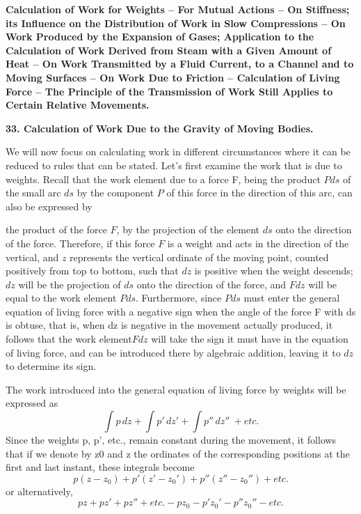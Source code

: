 \documentclass{book}
\begin{document}

\textbf{Calculation of Work for Weights – For Mutual Actions – On Stiffness; its Influence on the Distribution of Work in Slow Compressions – On Work Produced by the Expansion of Gases; Application to the Calculation of Work Derived from Steam with a Given Amount of Heat – On Work Transmitted by a Fluid Current, to a Channel and to Moving Surfaces – On Work Due to Friction – Calculation of Living Force – The Principle of the Transmission of Work Still Applies to Certain Relative Movements.}
\vspace{4mm}

\vspace{4mm}
\textbf{33. Calculation of Work Due to the Gravity of Moving Bodies.}
\vspace{4mm} 


We will now focus on calculating work in different circumstances where it can be reduced to rules that can be stated.
Let's first examine the work that is due to weights.
Recall that the work element due to a force F, being the product \(Pds\) of the small arc \(ds\) by the component \(P\) of this force in the direction of this arc, can also be expressed by 

the product of the force \(F\), by the projection of the element \(ds\) onto the direction of the force. Therefore, if this force \(F\) is a weight and acts in the direction of the vertical, and \(z\) represents the vertical ordinate of the moving point, counted positively from top to bottom, such that \(dz\) is positive when the weight descends; \(dz\) will be the projection of \(ds\) onto the direction of the force, and \(Fdz\) will be equal to the work element 
 \(Pds\). Furthermore, since \(Pds\) must enter the general equation of living force with a negative sign when the angle of the force F with ds is obtuse, that is, when dz is negative in the movement actually produced, it follows that the work element\(Fdz\) will take the sign it must have in the equation of living force, and can be introduced there by algebraic addition, leaving it to \(dz\) to determine its sign.

 The work introduced into the general equation of living force by weights will be expressed as
\[\int p\,dz + \int p'\,dz' + \int p''\,dz''\ + etc. \]
Since the weights p, p', etc., remain constant during the movement, it follows that if we denote by z0 and z the ordinates of the corresponding positions at the first and last instant, these integrals become
\[ p(z-z_0) + p'(z'-z_0') + p''(z''-z_0'') + etc.\]
or alternatively,
\[ pz + pz' + pz'' + etc. - pz_0 - p'z_0' -  p''z_0'' - etc.\]
\end{document}

